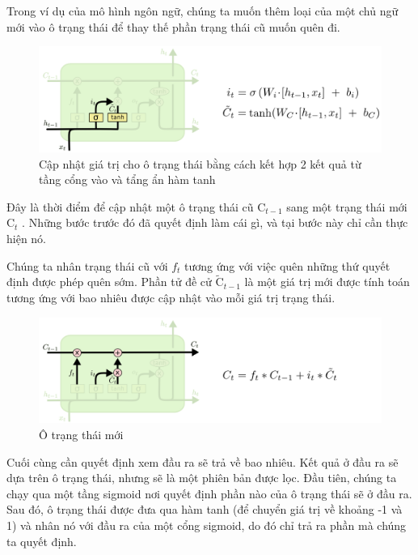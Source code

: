 \indent Trong ví dụ của mô hình ngôn ngữ, chúng ta muốn thêm loại của một chủ ngữ mới vào ô trạng thái để thay thế phần trạng thái cũ muốn quên đi.

\begin{figure}[H]
    \centering
    \includegraphics[width=14cm]{Images/Architecture/LSTM3-focus-i.png}
\caption{ Cập nhật giá trị cho ô trạng thái bằng cách kết hợp 2 kết quả từ tầng cổng vào và tẩng ẩn hàm tanh}
\end{figure}

\indent Đây là thời điểm để cập nhật một ô trạng thái cũ \( \text{C}_{t-1} \)
 sang một trạng thái mới \( \text{C}_{t} \)
. Những bước trước đó đã quyết định làm cái gì, và tại bước này chỉ cần thực hiện nó.

\indent Chúng ta nhân trạng thái cũ với \( f_{t} \)
 tương ứng với việc quên những thứ quyết định được phép quên sớm. Phần tử đề cử \( \tilde{\text{C}}_{t-1} \)
 là một giá trị mới được tính toán tương ứng với bao nhiêu được cập nhật vào mỗi giá trị trạng thái.

 \begin{figure}[H]
    \centering
    \includegraphics[width=14cm]{Images/Architecture/LSTM3-focus-C.png}
\caption{Ô trạng thái mới}
\end{figure}

\indent Cuối cùng cần quyết định xem đầu ra sẽ trả về bao nhiêu. Kết quả ở đầu ra sẽ dựa trên ô trạng thái, nhưng sẽ là một phiên bản được lọc. Đầu tiên, chúng ta chạy qua một tầng sigmoid nơi quyết định phần nào của ô trạng thái sẽ ở đầu ra. Sau đó, ô trạng thái được đưa qua hàm tanh (để chuyển giá trị về khoảng -1 và 1) và nhân nó với đầu ra của một cổng sigmoid, do đó chỉ trả ra phần mà chúng ta quyết định.

